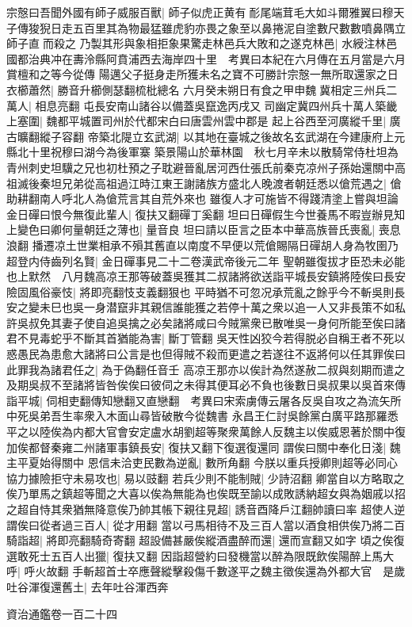 宗慤曰吾聞外國有師子威服百獸|{
	師子似虎正黄有耏尾端茸毛大如斗爾雅翼曰穆天子傳狻猊日走五百里其為物最猛雖虎豹亦畏之象至以鼻捲泥自塗數尺數數噴鼻隅立師子直而殺之}
乃製其形與象相拒象果驚走林邑兵大敗和之遂克林邑|{
	水綬注林邑國都治典冲在夀泠縣阿賁浦西去海岸四十里　考異曰本紀在六月傳在五月當是六月賞檀和之等今從傳}
陽邁父子挺身走所獲未名之寶不可勝計宗慤一無所取還家之日衣櫛蕭然|{
	勝音升櫛側瑟翻梳枇總名}
六月癸未朔日有食之甲申魏冀相定三州兵二萬人|{
	相息亮翻}
屯長安南山諸谷以備蓋吳竄逸丙戌又司幽定冀四州兵十萬人築畿上塞圍|{
	魏都平城置司州於代都宋白曰唐雲州雲中郡是}
起上谷西至河廣縱千里|{
	廣古曠翻縱子容翻}
帝築北隄立玄武湖|{
	以其地在臺城之後故名玄武湖在今建康府上元縣北十里祝穆曰湖今為後軍寨}
築景陽山於華林園　秋七月辛未以散騎常侍杜坦為青州刺史坦驥之兄也初杜預之子耽避晉亂居河西仕張氏前秦克凉州子孫始還關中高祖滅後秦坦兄弟從高祖過江時江東王謝諸族方盛北人晚渡者朝廷悉以傖荒遇之|{
	傖助耕翻南人呼北人為傖荒言其自荒外來也}
雖復人才可施皆不得踐清塗上嘗與坦論金日磾曰恨今無復此輩人|{
	復扶又翻磾丁奚翻}
坦曰日磾假生今世養馬不暇豈辦見知上變色曰卿何量朝廷之薄也|{
	量音良}
坦曰請以臣言之臣本中華高族晉氏喪亂|{
	喪息浪翻}
播遷凉土世業相承不殞其舊直以南度不早便以荒傖賜隔日磾胡人身為牧圉乃超登内侍齒列名賢|{
	金日磾事見二十二卷漢武帝後元二年}
聖朝雖復拔才臣恐未必能也上默然　八月魏高凉王那等破蓋吳獲其二叔諸將欲送詣平城長安鎮將陸俟曰長安險固風俗豪忮|{
	將即亮翻忮支義翻狠也}
平時猶不可忽况承荒亂之餘乎今不斬吳則長安之變未巳也吳一身潜竄非其親信誰能獲之若停十萬之衆以追一人又非長策不如私許吳叔免其妻子使自追吳擒之必矣諸將咸曰今賊黨衆已散唯吳一身何所能至俟曰諸君不見毒蛇乎不斷其首猶能為害|{
	斷丁管翻}
吳天性凶狡今若得脱必自稱王者不死以惑愚民為患愈大諸將曰公言是也但得賊不殺而更遣之若遂往不返將何以任其罪俟曰此罪我為諸君任之|{
	為于偽翻任音壬}
高凉王那亦以俟計為然遂赦二叔與刻期而遣之及期吳叔不至諸將皆咎俟俟曰彼伺之未得其便耳必不負也後數日吳叔果以吳首來傳詣平城|{
	伺相吏翻傳知戀翻又直戀翻　考異曰宋索虜傳云屠各反吳自攻之為流矢所中死吳弟吾生率衆入木面山尋皆破散今從魏書}
永昌王仁討吳餘黨白廣平路那羅悉平之以陸俟為内都大官會安定盧水胡劉超等聚衆萬餘人反魏主以俟威恩著於關中復加俟都督秦雍二州諸軍事鎮長安|{
	復扶又翻下復選復還同}
謂俟曰關中奉化日淺|{
	魏主平夏始得關中}
恩信未洽吏民數為逆亂|{
	數所角翻}
今朕以重兵授卿則超等必同心協力據險拒守未易攻也|{
	易以豉翻}
若兵少則不能制賊|{
	少詩沼翻}
卿當自以方略取之俟乃單馬之鎮超等聞之大喜以俟為無能為也俟既至諭以成敗誘納超女與為姻戚以招之超自恃其衆猶無降意俟乃帥其帳下親往見超|{
	誘音酉降戶江翻帥讀曰率}
超使人逆謂俟曰從者過三百人|{
	從才用翻}
當以弓馬相待不及三百人當以酒食相供俟乃將二百騎詣超|{
	將即亮翻騎奇寄翻}
超設備甚嚴俟縱酒盡醉而還|{
	還而宣翻又如字}
頃之俟復選敢死士五百人出獵|{
	復扶又翻}
因詣超營約曰發機當以醉為限既飲俟陽醉上馬大呼|{
	呼火故翻}
手斬超首士卒應聲縱擊殺傷千數遂平之魏主徵俟還為外都大官　是歲吐谷渾復還舊土|{
	去年吐谷渾西奔}


資治通鑑卷一百二十四
